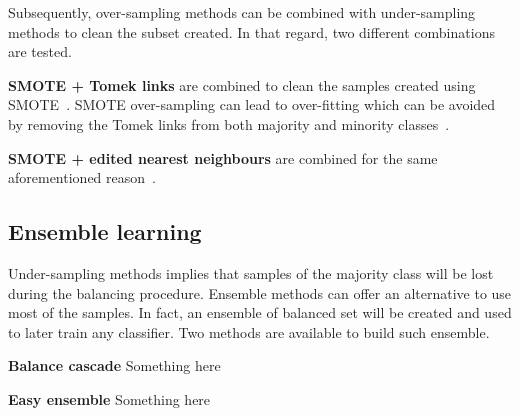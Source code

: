\documentclass[twoside,11pt]{article}
\begin{document}
Subsequently, over-sampling methods can be combined with under-sampling methods to clean the subset created.
In that regard, two different combinations are tested.

\textbf{SMOTE + Tomek links} are combined to clean the samples created using SMOTE~\citep{batista2003balancing}.
SMOTE over-sampling can lead to over-fitting which can be avoided by removing the Tomek links from both majority and minority classes~\citep{prati2009data}.

\textbf{SMOTE + edited nearest neighbours} are combined for the same aforementioned reason~\citep{batista2004study}.

\subsection{Ensemble learning}

Under-sampling methods implies that samples of the majority class will be lost during the balancing procedure.
Ensemble methods can offer an alternative to use most of the samples.
In fact, an ensemble of balanced set will be created and used to later train any classifier.
Two methods are available to build such ensemble.

\textbf{Balance cascade} Something here

\textbf{Easy ensemble} Something here
\end{document}

